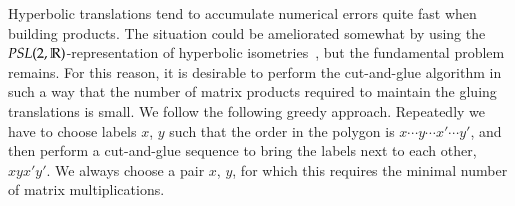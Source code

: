 \documentclass[Thesis]{subfiles}
\begin{document}
Hyperbolic translations tend to accumulate numerical errors quite fast when
building products. The situation could be ameliorated somewhat by using
the $PSL(2,\mathbb R)$-representation of hyperbolic
isometries~\cite{Floyd2002}, but the fundamental problem remains. For
this reason, it is desirable to perform the cut-and-glue algorithm in
such a way that the number of matrix products required to maintain the
gluing translations is small. We follow the following greedy
approach. Repeatedly we have to choose labels $x$, $y$ such that the
order in the polygon is $x\cdots y\cdots x'\cdots y'$, and then
perform a cut-and-glue sequence to bring the labels next to each
other, $xyx'y'$. We always choose a pair $x$, $y$, for which this
requires the minimal number of matrix multiplications.



\end{document}
